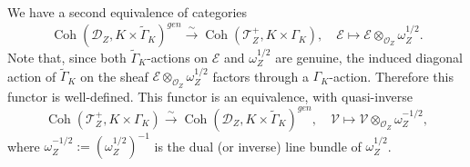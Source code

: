 \documentclass[11pt, a4paper]{amsart}
\newcommand{\C}{\mathbb{C}}
\newcommand{\orb}{\mathbb{O}}
\newcommand{\orbk}{\orb_{K}}
\newcommand{\cF}{\mathcal{F}}
\newcommand{\cE}{\mathcal{E}}
\newcommand{\cV}{\mathcal{V}}
\newcommand{\sD}{\mathscr{D}}
\newcommand{\cHom}{\mathcal{H}om}
\newcommand{\tGamma}{\widetilde{\Gamma}}
\DeclareMathOperator{\Coh}{Coh}
\newcommand{\smallhalf}{{\scriptscriptstyle 1/2}}
\newcommand{\TT}{\mathscr{T}}
\newcommand{\cm}{\C^\times}
\newcommand{\OO}{\mathcal{O}}
\theoremstyle{definition}
\numberwithin{equation}{section}
\begin{document}



We have a second equivalence of categories
\begin{equation} \label{eq:equiv_twist_omega}
    \Coh(\sD_Z, K \times \tGamma_K)^{gen} \xrightarrow{\sim} \Coh(\TT^+_Z, K \times \Gamma_K), \quad \cE \mapsto \cE \otimes_{\OO_Z} \omega_Z^{\smallhalf}. %
\end{equation}
Note that, since both $\tGamma_K$-actions on $\cE$ and $\omega_Z^{\smallhalf}$ are genuine, the induced diagonal action of $\tGamma_K$ on the sheaf $\cE \otimes_{\OO_Z} \omega_Z^{\smallhalf}$ factors through a $\Gamma_K$-action. Therefore this functor is well-defined. 
This functor is an equivalence, with quasi-inverse
\begin{equation} \label{eq:equiv_twist_omega_inverse}
	\Coh(\TT^+_Z, K \times \Gamma_K) \xrightarrow{\sim} \Coh(\sD_Z, K \times \tGamma_K)^{gen}, \quad \cV \mapsto \cV \otimes_{\OO_Z} \omega_Z^{-\smallhalf},
\end{equation}
where $\omega_Z^{-\smallhalf} := (\omega_Z^{\smallhalf})^{-1}$ is the dual (or inverse) line bundle of $\omega_Z^{\smallhalf}$.
\end{document}
